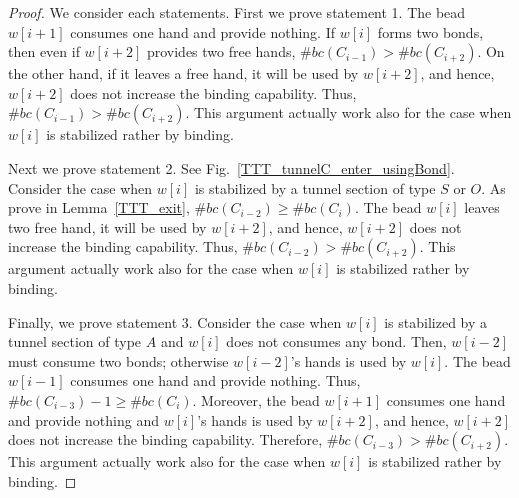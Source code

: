 \begin{proof}

	We consider each statements. First we prove statement 1.
	The bead $w[i+1]$ consumes one hand and provide nothing.
	If $w[i]$ forms two bonds, then even if $w[i+2]$ provides two free hands, $\#bc(C_{i-1}) > \#bc(C_{i+2})$.
	On the other hand, if it leaves a free hand, it will be used by $w[i+2]$, and hence, $w[i+2]$ does not increase the binding capability.
	Thus, $\#bc(C_{i-1}) > \#bc(C_{i+2})$.
	This argument actually work also for the case when $w[i]$ is stabilized rather by binding.
	
	Next we prove statement 2.
	See Fig.~\ref{TTT_tunnelC_enter_usingBond}.
	Consider the case when $w[i]$ is stabilized by a tunnel section of type $S$ or $O$.
	As prove in Lemma~\ref{TTT_exit}, $\#bc(C_{i-2}) \geq \#bc(C_{i})$.%
	The bead $w[i]$ leaves two free hand, it will be used by $w[i+2]$, and hence, $w[i+2]$ does not increase the binding capability.
	Thus, $\#bc(C_{i-2}) > \#bc(C_{i+2})$.
	This argument actually work also for the case when $w[i]$ is stabilized rather by binding.
	
	Finally, we prove statement 3.
	Consider the case when $w[i]$ is stabilized by a tunnel section of type $A$ and $w[i]$ does not consumes any bond.
	Then, $w[i-2]$ must consume two bonds; otherwise $w[i-2]$'s hands is used by $w[i]$.
	The bead $w[i-1]$ consumes one hand and provide nothing.
	Thus,  $\#bc(C_{i-3}) - 1 \geq \#bc(C_{i})$.
	Moreover, the bead $w[i+1]$ consumes one hand and provide nothing and $w[i]$'s hands is used by $w[i+2]$, and hence, $w[i+2]$ does not increase the binding capability.
	Therefore, $\#bc(C_{i-3}) > \#bc(C_{i+2})$.
	This argument actually work also for the case when $w[i]$ is stabilized rather by binding.
\end{proof}


